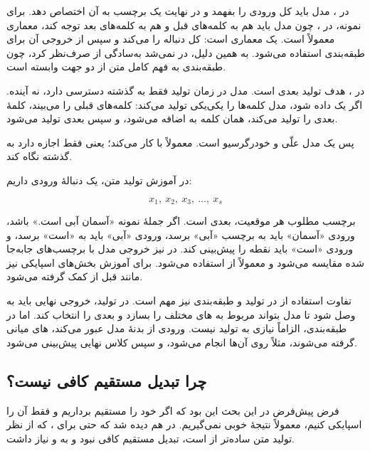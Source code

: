 در ، مدل باید کل ورودی را بفهمد و در نهایت یک برچسب به آن اختصاص دهد. برای نمونه، در ، چون مدل باید هم به کلمه‌های قبل و هم به کلمه‌های بعد توجه کند، معماری معمولاً  است.  یک معماری  است: کل دنباله را  می‌کند و سپس از خروجی آن برای طبقه‌بندی استفاده می‌شود. به همین دلیل، در  نمی‌شد به‌سادگی از  صرف‌نظر کرد، چون طبقه‌بندی به فهم کامل متن از دو جهت وابسته است.

در ، هدف تولید  بعدی است. مدل در زمان تولید فقط به گذشته دسترسی دارد، نه آینده. اگر یک  داده شود، مدل کلمه‌ها را یکی‌یکی تولید می‌کند: کلمه‌های قبلی را می‌بیند، کلمهٔ بعدی را تولید می‌کند، همان کلمه به  اضافه می‌شود، و سپس  بعدی تولید می‌شود.

پس  یک مدل علّی و خودرگرسیو است. معمولاً با  کار می‌کند؛ یعنی  فقط اجازه دارد به گذشته نگاه کند.

در آموزش تولید متن، یک دنبالهٔ ورودی داریم:

\[
x_1,\ x_2,\ x_3,\ \ldots,\ x_s
\]

برچسب مطلوب هر موقعیت،  بعدی است. اگر جملهٔ نمونه «آسمان آبی است.» باشد، ورودی «آسمان» باید به برچسب «آبی» برسد، ورودی «آبی» باید به «است» برسد، و ورودی «است» باید نقطه را پیش‌بینی کند. در  نیز خروجی مدل با برچسب‌های جابه‌جا شده مقایسه می‌شود و معمولاً از  استفاده می‌شود. برای آموزش بخش‌های اسپایکی نیز مانند قبل از  کمک گرفته می‌شود.

تفاوت استفاده از  در تولید و طبقه‌بندی نیز مهم است. در تولید، خروجی نهایی باید به  وصل شود تا مدل بتواند  مربوط به های مختلف را بسازد و  بعدی را انتخاب کند. اما در طبقه‌بندی، الزاماً نیازی به  تولید  نیست. ورودی از بدنهٔ مدل عبور می‌کند، های میانی گرفته می‌شوند، مثلاً روی آن‌ها  انجام می‌شود، و سپس کلاس نهایی پیش‌بینی می‌شود.


\subsection{چرا تبدیل مستقیم  کافی نیست؟}
فرض پیش‌فرض در این بحث این بود که اگر خود  را مستقیم برداریم و فقط آن را اسپایکی کنیم، معمولاً نتیجهٔ خوبی نمی‌گیریم. در  هم دیده شد که حتی برای ، که از نظر تولید متن ساده‌تر از  است، تبدیل مستقیم کافی نبود و به  و  نیاز داشت.

